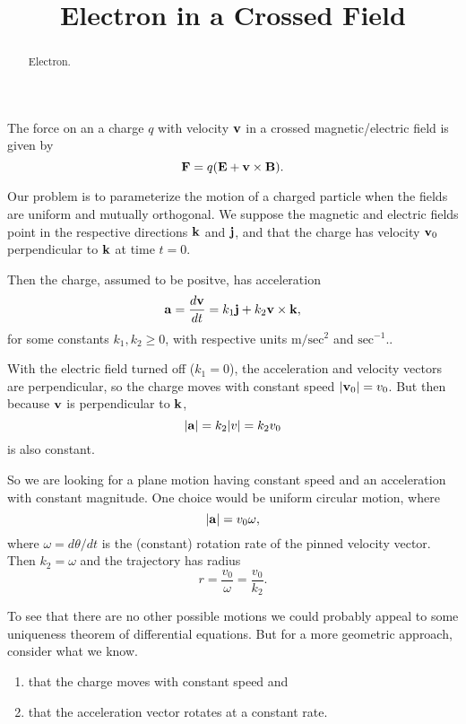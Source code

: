 \documentclass{ximera}
\title{Electron in a Crossed Field}
\begin{document}
\begin{abstract}
Electron.
\end{abstract}
\maketitle

The force on an a charge $q$ with velocity ${\bf v}$ in a crossed magnetic/electric field is given by
\[
     {\bf F} = q ({\bf E} + {\bf v}\times {\bf B} ) .
\]

Our problem is to parameterize the motion of a charged particle when the fields are uniform and mutually orthogonal. We suppose the magnetic and electric fields point in the respective directions ${\bf k}$ and ${\bf j}$, and that the charge has velocity ${\bf v}_0$ perpendicular to ${\bf k}$ at time $t=0$.

Then the charge, assumed to be positve, has acceleration
\[
    {\bf a} =  \frac{d {\bf v}}{dt} = k_1 {\bf j} + k_2 {\bf v}\times {\bf k} ,
\]
for some constants $k_1, k_2 \geq 0$, with respective units $\text{m}/\text{sec}^2$ and $\text{sec}^{-1}$..

With the electric field turned off ($k_1=0$), the acceleration and velocity vectors are perpendicular, so the charge moves with constant speed $|{\bf v}_0| = v_0$. But then because ${\bf v}$ is perpendicular to ${\bf k}$,
\[
      |{\bf a}| = k_2 |v| = k_2 v_0
\]
is also constant.

So we are looking for a plane motion having constant speed and an acceleration with constant magnitude. One choice would be uniform circular motion, where
\[
    |{\bf a}| = v_0 \omega ,
\]
where $\omega = d\theta/dt$ is the (constant) rotation rate of the pinned velocity vector. Then $k_2 = \omega$ and the trajectory has radius
\[
   r = \frac{v_0}{\omega} = \frac{v_0}{k_2} .
\]

To see that there are no other possible motions we could probably appeal to some uniqueness theorem of differential equations. But for a more geometric approach, consider what we know.

\begin{enumerate}
\item that the charge moves with constant speed and

\item that the acceleration vector rotates at a constant rate.
\end{enumerate}
\end{document}
